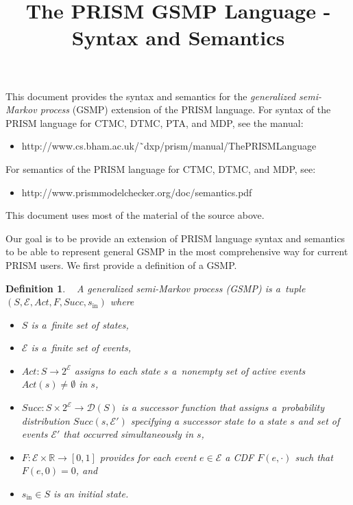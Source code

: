\documentclass{article}
\title{The PRISM GSMP Language - Syntax and Semantics}
\newtheorem{definition}[theorem]{Definition}
\newcommand{\Rset}{\mathbb{R}}
\newcommand{\calG}{\mathcal{G}}
\newcommand{\calE}{\mathcal{E}}
\newcommand{\events}{{\calE}}
\newcommand{\suc}{Succ}
\newcommand{\initstate}{s_\mathrm{in}}
\newcommand{\act}{Act}
\newcommand{\dist}{\mathcal{D}}
\begin{document}
\maketitle

\noindent
This document provides the syntax and semantics for the \emph{generalized semi-Markov process} (GSMP) extension of the PRISM language.
For syntax of the PRISM language for CTMC, DTMC, PTA, and MDP, see the manual:
\begin{itemize}
	\item http://www.cs.bham.ac.uk/˜dxp/prism/manual/ThePRISMLanguage
\end{itemize}
For semantics of the PRISM language for CTMC, DTMC, and MDP, see:
\begin{itemize}
	\item http://www.prismmodelchecker.org/doc/semantics.pdf
\end{itemize}
This document uses most of the material of the source above.

Our goal is to be provide an extension of PRISM language syntax and semantics to be able to represent general GSMP in the most comprehensive way for current PRISM users. 
We first provide a definition of a GSMP.
\begin{definition}~\cite{Haas:book} A generalized semi-Markov process (GSMP) is a~tuple $%
	(S,\events,\act,F,\suc,\initstate)$ where
	\begin{itemize}
		\item $S$ is a~finite set of states,
		\item $\events$ is a~finite set of \emph{events},
		\item $\act \colon S \rightarrow 2^{\events}$ assigns to each state $s$ a~nonempty set of active events $\act(s) \not = \emptyset$ in $s$,
		\item $\suc : S \times 2^{\events} \rightarrow \dist(S)$ is a \emph{successor function} that assigns a~probability distribution $\suc(s,\events')$ specifying a successor state to a state $s$ and set of events $\events'$ that occurred simultaneously in $s$,	
		\item $F\colon \events \times \Rset \rightarrow [0,1]$ provides for each event $e \in \events$ a CDF $F(e,\cdot)$ such that $F(e,0)=0$, and 
		\item $\initstate \in S$ is an \emph{initial state}.
	\end{itemize}
\end{definition}
\end{document}
